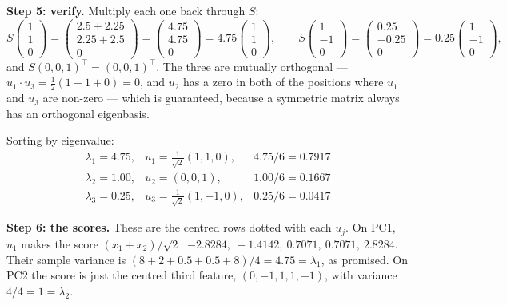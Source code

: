 \documentclass[11pt]{article}
\begin{document}
\begin{worked}
\medskip
\textbf{Step 5: verify.} Multiply each one back through $S$:
\[
  S\begin{pmatrix}1\\1\\0\end{pmatrix}
    = \begin{pmatrix}2.5+2.25\\2.25+2.5\\0\end{pmatrix}
    = \begin{pmatrix}4.75\\4.75\\0\end{pmatrix}
    = 4.75\begin{pmatrix}1\\1\\0\end{pmatrix},
  \qquad
  S\begin{pmatrix}1\\-1\\0\end{pmatrix}
    = \begin{pmatrix}0.25\\-0.25\\0\end{pmatrix}
    = 0.25\begin{pmatrix}1\\-1\\0\end{pmatrix},
\]
and $S(0,0,1)^{\!\top} = (0,0,1)^{\!\top}$. The three are mutually
orthogonal --- $u_1 \cdot u_3 = \frac{1}{2}(1 - 1 + 0) = 0$, and $u_2$ has a
zero in both of the positions where $u_1$ and $u_3$ are non-zero --- which is
guaranteed, because a symmetric matrix always has an orthogonal eigenbasis.

Sorting by eigenvalue:
\[
  \begin{array}{lll}
    \lambda_1 = 4.75, & u_1 = \tfrac{1}{\sqrt2}(1,1,0), & 4.75/6 = 0.7917\\[2pt]
    \lambda_2 = 1.00, & u_2 = (0,0,1),                  & 1.00/6 = 0.1667\\[2pt]
    \lambda_3 = 0.25, & u_3 = \tfrac{1}{\sqrt2}(1,-1,0),& 0.25/6 = 0.0417
  \end{array}
\]

\medskip
\textbf{Step 6: the scores.} These are the centred rows dotted with each
$u_j$. On PC1, $u_1$ makes the score $(x_1 + x_2)/\sqrt2$:
$-2.8284,\ -1.4142,\ 0.7071,\ 0.7071,\ 2.8284$. Their sample variance is
$(8 + 2 + 0.5 + 0.5 + 8)/4 = 4.75 = \lambda_1$, as promised. On PC2 the score
is just the centred third feature, $(0,-1,1,1,-1)$, with variance
$4/4 = 1 = \lambda_2$.
\end{worked}
\end{document}
